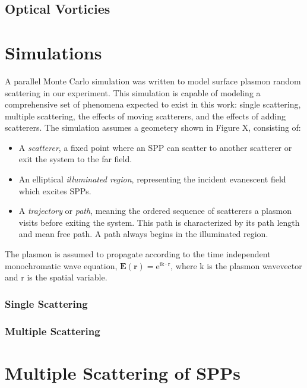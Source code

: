 \documentclass[a4paper,titlepage,onecolumn]{report}
\newcommand{\me}{{\mathrm{e}}}
\newcommand{\mi}{{\mathrm{i}}}
\begin{document}
\section{Optical Vorticies}


\chapter{Simulations}
A parallel Monte Carlo simulation was written to model surface plasmon
random scattering in our experiment. This simulation is capable of modeling
a comprehensive set of phenomena expected to exist in this work: single
scattering, multiple scattering, the effects of moving scatterers, and the
effects of adding scatterers. The simulation assumes a geometery shown in
Figure X, consisting of:

\begin{itemize}

\item A \textit{scatterer}, a fixed point where an SPP can scatter to
another scatterer or exit the system to the far field.

\item An elliptical \textit{illuminated region}, representing the incident
evanescent field which excites SPPs.

\item A \textit{trajectory} or \textit{path}, meaning the ordered sequence
of scatterers a plasmon visits before exiting the system. This path is
characterized by its path length and mean free path. A path always begins
in the illuminated region.

\end{itemize}

The plasmon is assumed to propagate according to the time independent
monochromatic wave equation, $\mathbf{E}(\mathbf{r})=\me^{\mi
\mathrm{k}\cdot \mathrm{r}}$, where $\mathrm{k}$ is the plasmon wavevector
and $\mathrm{r}$ is the spatial variable.

\subsection{Single Scattering}

\subsection{Multiple Scattering}
 

\chapter{Multiple Scattering of SPPs}
\end{document}
